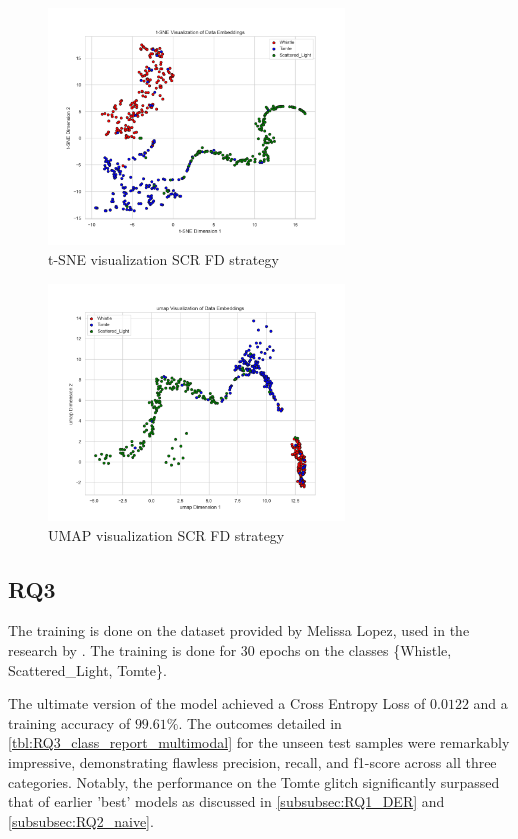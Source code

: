 \begin{figure}[H]
    \centering
    \includegraphics[width=0.7\textwidth]{Images/tSNE_FractalDimension_SCR_test.png}
    \caption{t-SNE visualization SCR FD strategy}
    \label{fig:tsne_FD_SCR}
\end{figure}

\begin{figure}[H]
    \centering
    \includegraphics[width=0.7\textwidth]{Images/umap_FractalDimension_SCR_test.png}
    \caption{UMAP visualization SCR FD strategy}
    \label{fig:umap_FD_SCR}
\end{figure}
\newpage

\subsection{RQ3}
\label{subsub:rq3}
The training is done on the dataset provided by Melissa Lopez, used in the research by \citep{laguarta2023detection, dooney2022dvgan, dooney2024cdvgan}. The training is done for 30 epochs on the classes \{Whistle, Scattered\_Light, Tomte\}. 

The ultimate version of the model achieved a Cross Entropy Loss of $0.0122$ and a training accuracy of $99.61\%$. The outcomes detailed in \ref{tbl:RQ3_class_report_multimodal} for the unseen test samples were remarkably impressive, demonstrating flawless precision, recall, and f1-score across all three categories. Notably, the performance on the Tomte glitch significantly surpassed that of earlier 'best' models as discussed in \ref{subsubsec:RQ1_DER} and \ref{subsubsec:RQ2_naive}.

